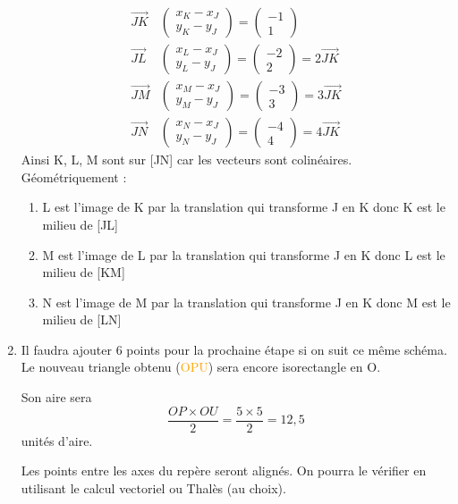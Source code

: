 \begin{enumerate}[label=G\arabic*)]
	\begin{align*}
	\overrightarrow{JK}&\begin{pmatrix}x_K - x_J\\ y_K - y_J\end{pmatrix}=\begin{pmatrix}-1\\1\end{pmatrix}\\
	\overrightarrow{JL}&\begin{pmatrix}x_L - x_J\\ y_L - y_J\end{pmatrix}=\begin{pmatrix}-2\\ 2\end{pmatrix} = 2\overrightarrow{JK}\\
	\overrightarrow{JM}&\begin{pmatrix}x_M - x_J\\ y_M - y_J\end{pmatrix}=\begin{pmatrix}-3\\ 3\end{pmatrix} = 3\overrightarrow{JK}\\
	\overrightarrow{JN}&\begin{pmatrix}x_N - x_J\\ y_N - y_J\end{pmatrix}=\begin{pmatrix}-4\\ 4\end{pmatrix} = 4\overrightarrow{JK}
	\end{align*}
	Ainsi K, L, M sont sur [JN] car les vecteurs sont colinéaires. Géométriquement :
	\begin{enumerate}
		\item L est l'image de K par la translation qui transforme J en K donc K est le milieu de [JL]
		\item M est l'image de L par la translation qui transforme J en K donc L est le milieu de [KM]
		\item N est l'image de M par la translation qui transforme J en K donc M est le milieu de [LN]
	\end{enumerate}
	\item Il faudra ajouter 6 points pour la prochaine étape si on suit ce même schéma. Le nouveau triangle obtenu (\textcolor{orange}{OPU}) sera encore isorectangle en O. 
	
	Son aire sera  \[\dfrac{OP\times OU}{2} = \dfrac{5\times 5}{2} = 12,5\] unités d'aire.

	
	Les points entre les axes du repère seront alignés. On pourra le vérifier en utilisant le calcul vectoriel ou Thalès (au choix). 
\end{enumerate}

